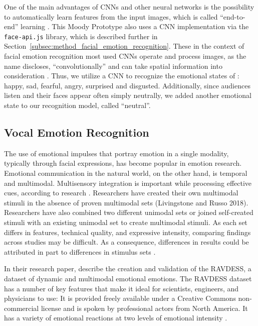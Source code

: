 One of the main advantages of CNNs and other neural networks is the possibility to automatically learn features from the input images, which is called ``end-to-end'' learning \cite{ko_brief_2018}. This Moody Prototype also uses a CNN implementation via the \texttt{face-api.js} library, which is described further in Section~\ref{subsec:method_facial_emotion_recognition}. These in the context of facial emotion recognition most used CNNs operate and process images, as the name discloses, ``convolutionally'' and can take spatial information into consideration \cite{ko_brief_2018, rosler_reducing_2021}. Thus, we utilize a CNN to recognize the emotional states of : happy, sad, fearful, angry, surprised and disgusted. Additionally, since audiences listen and their faces appear often simply neutrally, we added another emotional state to our recognition model, called ``neutral''.

\subsection{Vocal Emotion Recognition}
\label{subsec:related_work_vocal_emotion_recognition}
The use of emotional impulses that portray emotion in a single modality, typically through facial expressions, has become popular in emotion research. Emotional communication in the natural world, on the other hand, is temporal and multimodal. Multisensory integration is important while processing effective cues, according to research \cite{livingstone_ryerson_2018}. Researchers have created their own multimodal stimuli in the absence of proven multimodal sets (Livingstone and Russo 2018). Researchers have also combined two different unimodal sets \cite{delle-vigne_subclinical_2014} or joined self-created stimuli with an existing unimodal set \cite{zvyagintsev_attention_2013} to create multimodal stimuli. As each set differs in features, technical quality, and expressive intensity, comparing findings across studies may be difficult. As a consequence, differences in results could be attributed in part to differences in stimulus sets \cite{livingstone_ryerson_2018}.

In their research paper,  describe the creation and validation of the RAVDESS, a dataset of dynamic and multimodal emotional emotions. The RAVDESS dataset has a number of key features that make it ideal for scientists, engineers, and physicians to use: It is provided freely available under a Creative Commons non-commercial license and is spoken by professional actors from North America. It has a variety of emotional reactions at two levels of emotional intensity \cite{livingstone_ryerson_2018}. 

